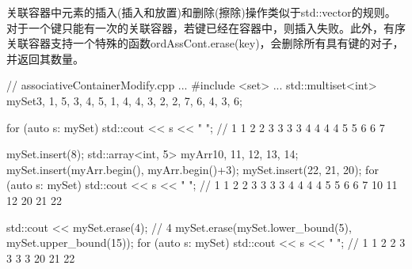 
关联容器中元素的插入(插入和放置)和删除(擦除)操作类似于std::vector的规则。对于一个键只能有一次的关联容器，若键已经在容器中，则插入失败。此外，有序关联容器支持一个特殊的函数ordAssCont.erase(key)，会删除所有具有键的对子，并返回其数量。


\begin{cpp}
// associativeContainerModify.cpp
...
#include <set>
...
std::multiset<int> mySet{3, 1, 5, 3, 4, 5, 1, 4, 4, 3, 2, 2, 7, 6, 4, 3, 6};

for (auto s: mySet) std::cout << s << " ";
	// 1 1 2 2 3 3 3 3 4 4 4 4 5 5 6 6 7

mySet.insert(8);
std::array<int, 5> myArr{10, 11, 12, 13, 14};
mySet.insert(myArr.begin(), myArr.begin()+3);
mySet.insert({22, 21, 20});
for (auto s: mySet) std::cout << s << " ";
	// 1 1 2 2 3 3 3 3 4 4 4 4 5 5 6 6 7 10 11 12 20 21 22
	
std::cout << mySet.erase(4); // 4
mySet.erase(mySet.lower_bound(5), mySet.upper_bound(15));
for (auto s: mySet) std::cout << s << " ";
	// 1 1 2 2 3 3 3 3 20 21 22
\end{cpp}


